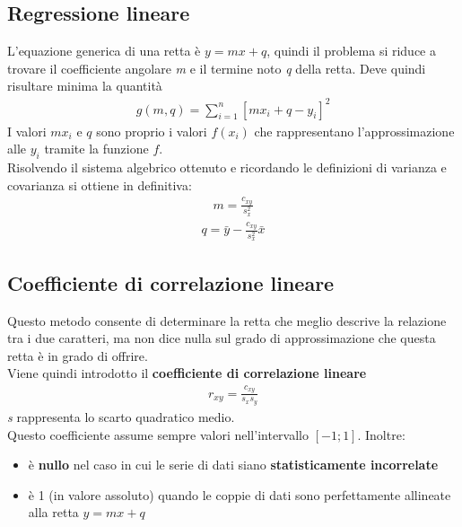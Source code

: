 \subsection{Regressione lineare}
L'equazione generica di una retta è $ y = mx + q$, quindi il problema si riduce a trovare il coefficiente angolare \textit{m} e il termine noto \textit{q} della retta. \newline
Deve quindi risultare minima la quantità
\begin{align}
	g(m,q) = \sum_{i = 1}^{n} [mx_i + q - y_i]^2
\end{align}
I valori $mx_i$ e $q$ sono proprio i valori $f(x_i)$ che rappresentano l'approssimazione alle $y_i$ tramite la funzione $f$. \\
Risolvendo il sistema algebrico ottenuto e ricordando le definizioni di varianza e covarianza si ottiene in definitiva:
\begin{align}
	m = \frac{c_{xy}}{s_x^2}
\end{align}
\begin{align}
	q = \bar{y} - \frac{c_{xy}}{s_x^2} \bar{x}
\end{align}

\subsection{Coefficiente di correlazione lineare}
Questo metodo consente di determinare la retta che meglio descrive la relazione tra i due caratteri, ma non dice nulla sul grado di approssimazione che questa retta è in grado di offrire. \\
Viene quindi introdotto il \textbf{coefficiente di correlazione lineare}
\begin{align}
	r_{xy} = \frac{c_{xy}}{s_x s_y}
\end{align}
\textit{s} rappresenta lo scarto quadratico medio. \\
Questo coefficiente assume sempre valori nell'intervallo $[-1; 1]$. Inoltre:
\begin{itemize}
	\item è \textbf{nullo} nel caso in cui le serie di dati siano \textbf{statisticamente incorrelate}
	\item è 1 (in valore assoluto) quando le coppie di dati sono perfettamente allineate alla retta $y = mx + q$
\end{itemize}

